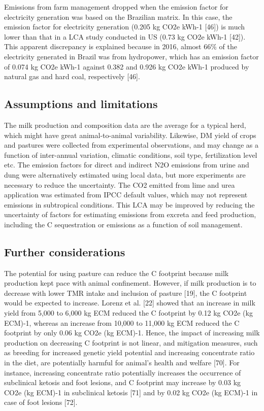\documentclass[11pt,a4paper]{article}
\begin{document}
Emissions from farm management dropped when the emission factor for electricity generation was based on the Brazilian matrix. In this case, the emission factor for electricity generation (0.205 kg CO2e kWh-1 [46]) is much lower than that in a LCA study conducted in US (0.73 kg CO2e kWh-1 [42]). This apparent discrepancy is explained because in 2016, almost 66\% of the electricity generated in Brazil was from hydropower, which has an emission factor of 0.074 kg CO2e kWh-1 against 0.382 and 0.926 kg CO2e kWh-1 produced by natural gas and hard coal, respectively [46].

\subsection{Assumptions and limitations}

The milk production and composition data are the average for a typical herd, which might have great animal-to-animal variability. Likewise, DM yield of crops and pastures were collected from experimental observations, and may change as a function of inter-annual variation, climatic conditions, soil type, fertilization level etc. The emission factors for direct and indirect N2O emissions from urine and dung were alternatively estimated using local data, but more experiments are necessary to reduce the uncertainty. The CO2 emitted from lime and urea application was estimated from IPCC default values, which may not represent emissions in subtropical conditions. This LCA may be improved by reducing the uncertainty of factors for estimating emissions from excreta and feed production, including the C sequestration or emissions as a function of soil management.

\subsection{Further considerations}

The potential for using pasture can reduce the C footprint because milk production kept pace with animal confinement. However, if milk production is to decrease with lower TMR intake and inclusion of pasture [19], the C footprint would be expected to increase. Lorenz et al. [22] showed that an increase in milk yield from 5,000 to 6,000 kg ECM reduced the C footprint by 0.12 kg CO2e (kg ECM)-1, whereas an increase from 10,000 to 11,000 kg ECM reduced the C footprint by only 0.06 kg CO2e (kg ECM)-1. Hence, the impact of increasing milk production on decreasing C footprint is not linear, and mitigation measures, such as breeding for increased genetic yield potential and increasing concentrate ratio in the diet, are potentially harmful for animal’s health and welfare [70]. For instance, increasing concentrate ratio potentially increases the occurrence of subclinical ketosis and foot lesions, and C footprint may increase by 0.03 kg CO2e (kg ECM)-1 in subclinical ketosis [71] and by 0.02 kg CO2e (kg ECM)-1 in case of foot lesions [72].
\end{document}
